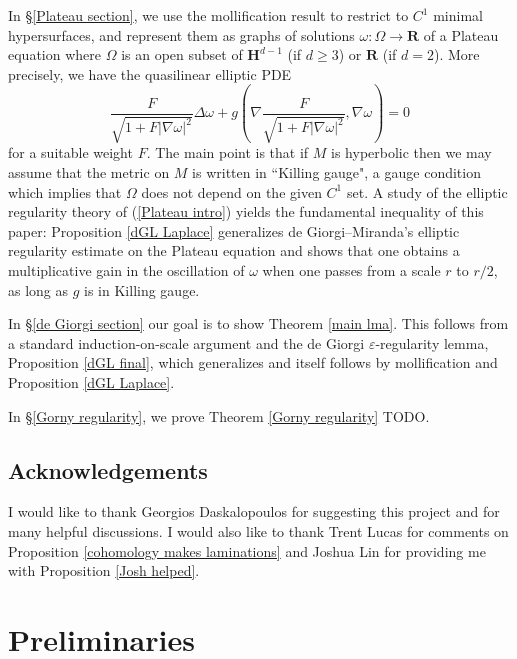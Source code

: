\documentclass[reqno,12pt,letterpaper]{amsart}
\newcommand{\RR}{\mathbf{R}}
\newcommand{\Hyp}{\mathbf H}
\theoremstyle{definition}
\numberwithin{equation}{section}
\begin{document}
In \S\ref{Plateau section}, we use the mollification result to restrict to $C^1$ minimal hypersurfaces, and represent them as graphs of solutions $\omega: \Omega \to \RR$ of a Plateau equation where $\Omega$ is an open subset of $\Hyp^{d - 1}$ (if $d \geq 3$) or $\RR$ (if $d = 2$). More precisely, we have the quasilinear elliptic PDE
\begin{equation}\label{Plateau intro}
\frac{F}{\sqrt{1 + F|\nabla \omega|^2}} \Delta \omega + g\left(\nabla \frac{F}{\sqrt{1 + F|\nabla \omega|^2}}, \nabla \omega\right) = 0
\end{equation}
for a suitable weight $F$. The main point is that if $M$ is hyperbolic then we may assume that the metric on $M$ is written in ``Killing gauge", a gauge condition which implies that $\Omega$ does not depend on the given $C^1$ set.
A study of the elliptic regularity theory of (\ref{Plateau intro}) yields the fundamental inequality of this paper: Proposition \ref{dGL Laplace} generalizes de Giorgi--Miranda's elliptic regularity estimate on the Plateau equation \cite[Teorema 4.3]{Miranda66} and shows that one obtains a multiplicative gain in the oscillation of $\omega$ when one passes from a scale $r$ to $r/2$, as long as $g$ is in Killing gauge.

In \S\ref{de Giorgi section} our goal is to show Theorem \ref{main lma}.
This follows from a standard induction-on-scale argument and the de Giorgi $\varepsilon$-regularity lemma, Proposition \ref{dGL final}, which generalizes \cite[Teorema 5.7]{Miranda66} and itself follows by mollification and Proposition \ref{dGL Laplace}.

In \S\ref{Gorny regularity}, we prove Theorem \ref{Gorny regularity} TODO.



\subsection{Acknowledgements}
I would like to thank Georgios Daskalopoulos for suggesting this project and for many helpful discussions.
I would also like to thank Trent Lucas for comments on Proposition \ref{cohomology makes laminations} and Joshua Lin for providing me with Proposition \ref{Josh helped}.

\section{Preliminaries}\label{prelims}
\end{document}

